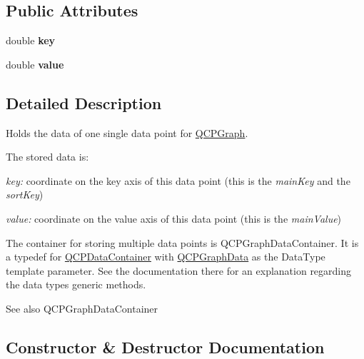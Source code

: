 \subsection*{Public Attributes}
\begin{DoxyCompactItemize}
\item 
\mbox{\label{class_q_c_p_graph_data_a2fcebdf84af975761c0661237d7e28ec}} 
double {\bfseries key}
\item 
\mbox{\label{class_q_c_p_graph_data_ac97e3ddbdcbe0b58d0b4d6f95250d59c}} 
double {\bfseries value}
\end{DoxyCompactItemize}


\subsection{Detailed Description}
Holds the data of one single data point for \mbox{\hyperlink{class_q_c_p_graph}{Q\+C\+P\+Graph}}. 

The stored data is\+: \begin{DoxyItemize}
\item {\itshape key\+:} coordinate on the key axis of this data point (this is the {\itshape main\+Key} and the {\itshape sort\+Key}) \item {\itshape value\+:} coordinate on the value axis of this data point (this is the {\itshape main\+Value})\end{DoxyItemize}
The container for storing multiple data points is Q\+C\+P\+Graph\+Data\+Container. It is a typedef for \mbox{\hyperlink{class_q_c_p_data_container}{Q\+C\+P\+Data\+Container}} with \mbox{\hyperlink{class_q_c_p_graph_data}{Q\+C\+P\+Graph\+Data}} as the Data\+Type template parameter. See the documentation there for an explanation regarding the data type\textquotesingle{}s generic methods.

\begin{DoxySeeAlso}{See also}
Q\+C\+P\+Graph\+Data\+Container 
\end{DoxySeeAlso}


\subsection{Constructor \& Destructor Documentation}
\mbox{\label{class_q_c_p_graph_data_ac43f7499383d2fa2ffb7a4ad43f76c7c}} 
